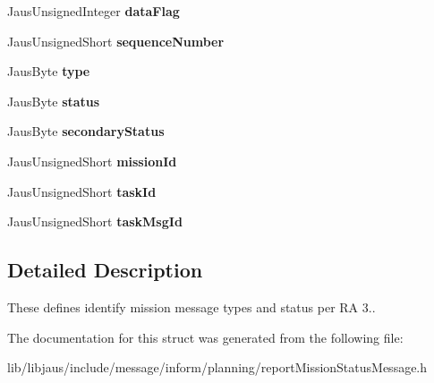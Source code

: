 \begin{DoxyCompactItemize}
\item 
\hypertarget{struct_report_mission_status_message_struct_a12344971fbc2575ce9251147d5893b20}{\-Jaus\-Unsigned\-Integer {\bfseries data\-Flag}}\label{struct_report_mission_status_message_struct_a12344971fbc2575ce9251147d5893b20}

\item 
\hypertarget{struct_report_mission_status_message_struct_aa40a2336878f9758b68d0bcb7d439276}{\-Jaus\-Unsigned\-Short {\bfseries sequence\-Number}}\label{struct_report_mission_status_message_struct_aa40a2336878f9758b68d0bcb7d439276}

\item 
\hypertarget{struct_report_mission_status_message_struct_a2a1cb15c1143bf274b9d7ed71ebb2a04}{\-Jaus\-Byte {\bfseries type}}\label{struct_report_mission_status_message_struct_a2a1cb15c1143bf274b9d7ed71ebb2a04}

\item 
\hypertarget{struct_report_mission_status_message_struct_a9610165e711c85c0622b3df9193084b0}{\-Jaus\-Byte {\bfseries status}}\label{struct_report_mission_status_message_struct_a9610165e711c85c0622b3df9193084b0}

\item 
\hypertarget{struct_report_mission_status_message_struct_ac419dbc3a4298d17d6f6094157464153}{\-Jaus\-Byte {\bfseries secondary\-Status}}\label{struct_report_mission_status_message_struct_ac419dbc3a4298d17d6f6094157464153}

\item 
\hypertarget{struct_report_mission_status_message_struct_ab79bc3ae3c9235ece021537b17bec232}{\-Jaus\-Unsigned\-Short {\bfseries mission\-Id}}\label{struct_report_mission_status_message_struct_ab79bc3ae3c9235ece021537b17bec232}

\item 
\hypertarget{struct_report_mission_status_message_struct_afc553d93c638ab048e8fe752db11a447}{\-Jaus\-Unsigned\-Short {\bfseries task\-Id}}\label{struct_report_mission_status_message_struct_afc553d93c638ab048e8fe752db11a447}

\item 
\hypertarget{struct_report_mission_status_message_struct_acd45763803d73a6a68f3c0d29f7cebff}{\-Jaus\-Unsigned\-Short {\bfseries task\-Msg\-Id}}\label{struct_report_mission_status_message_struct_acd45763803d73a6a68f3c0d29f7cebff}

\end{DoxyCompactItemize}


\subsection{\-Detailed \-Description}
\-These defines identify mission message types and status per \-R\-A 3.. 

\-The documentation for this struct was generated from the following file\-:\begin{DoxyCompactItemize}
\item 
lib/libjaus/include/message/inform/planning/report\-Mission\-Status\-Message.\-h\end{DoxyCompactItemize}
